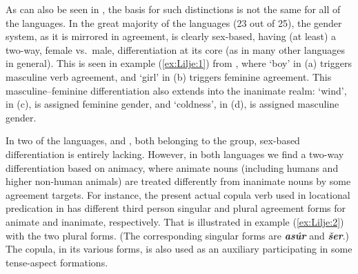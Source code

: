 \documentclass[output=collectionpaper]{langsci/langscibook}
\begin{document}
As can also be seen in , the basis for such distinctions is not the same for all of the languages. In the great majority of the languages (23 out of 25), the gender system, as it is mirrored in agreement, is clearly sex-based, having (at least) a two-way, female vs.\ male, differentiation at its core (as in many other  languages in general). This is seen in example (\ref{ex:Lilje:1}) from , where `boy' in (a) triggers masculine verb agreement, and `girl' in (b) triggers feminine agreement. This masculine--feminine differentiation also extends into the inanimate realm: `wind', in (c), is assigned feminine gender, and `coldness', in (d), is assigned masculine gender.

%

In two of the languages,  and , both belonging to the  group, sex-based differentiation is entirely lacking. However, in both languages we find a two-way differentiation based on animacy, where animate nouns (including humans and higher non-human animals) are treated differently from inanimate nouns by some agreement targets. For instance, the present actual copula verb used in locational predication in  has different third person singular and plural agreement forms for animate and inanimate, respectively. That is illustrated in example (\ref{ex:Lilje:2}) with the two plural forms. (The corresponding singular forms are \textbf{\textit{asú}}\textbf{\textit{r}} and \textbf{\textit{šer}}.) The copula, in its various forms, is also used as an auxiliary participating in some tense-aspect formations.
\end{document}
